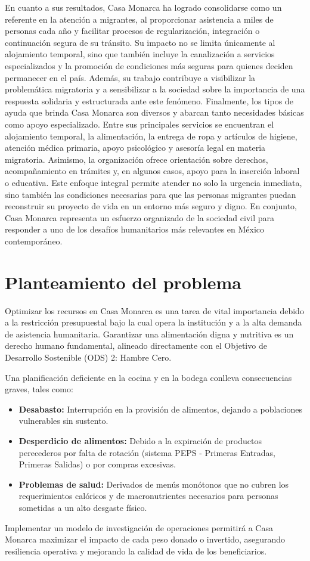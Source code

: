 \documentclass[12pt]{report}
\begin{document}
En cuanto a sus resultados, Casa Monarca ha logrado consolidarse como un referente en la atención a migrantes, al proporcionar asistencia a miles de personas cada año y facilitar procesos de regularización, integración o continuación segura de su tránsito. Su impacto no se limita únicamente al alojamiento temporal, sino que también incluye la canalización a servicios especializados y la promoción de condiciones más seguras para quienes deciden permanecer en el país. Además, su trabajo contribuye a visibilizar la problemática migratoria y a sensibilizar a la sociedad sobre la importancia de una respuesta solidaria y estructurada ante este fenómeno. Finalmente, los tipos de ayuda que brinda Casa Monarca son diversos y abarcan tanto necesidades básicas como apoyo especializado. Entre sus principales servicios se encuentran el alojamiento temporal, la alimentación, la entrega de ropa y artículos de higiene, atención médica primaria, apoyo psicológico y asesoría legal en materia migratoria. Asimismo, la organización ofrece orientación sobre derechos, acompañamiento en trámites y, en algunos casos, apoyo para la inserción laboral o educativa. Este enfoque integral permite atender no solo la urgencia inmediata, sino también las condiciones necesarias para que las personas migrantes puedan reconstruir su proyecto de vida en un entorno más seguro y digno. En conjunto, Casa Monarca representa un esfuerzo organizado de la sociedad civil para responder a uno de los desafíos humanitarios más relevantes en México contemporáneo.\\

\section{Planteamiento del problema}

Optimizar los recursos en Casa Monarca es una tarea de vital importancia debido a la restricción presupuestal bajo la cual opera la institución y a la alta demanda de asistencia humanitaria. Garantizar una alimentación digna y nutritiva es un derecho humano fundamental, alineado directamente con el Objetivo de Desarrollo Sostenible (ODS) 2: Hambre Cero.

Una planificación deficiente en la cocina y en la bodega conlleva consecuencias graves, tales como:
\begin{itemize}
    \item \textbf{Desabasto:} Interrupción en la provisión de alimentos, dejando a poblaciones vulnerables sin sustento.
    \item \textbf{Desperdicio de alimentos:} Debido a la expiración de productos perecederos por falta de rotación (sistema PEPS - Primeras Entradas, Primeras Salidas) o por compras excesivas.
    \item \textbf{Problemas de salud:} Derivados de menús monótonos que no cubren los requerimientos calóricos y de macronutrientes necesarios para personas sometidas a un alto desgaste físico.
\end{itemize}
Implementar un modelo de investigación de operaciones permitirá a Casa Monarca maximizar el impacto de cada peso donado o invertido, asegurando resiliencia operativa y mejorando la calidad de vida de los beneficiarios.
\end{document}
